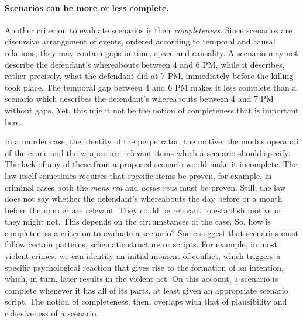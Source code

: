 \documentclass[10pt]{article}
\begin{document}






\paragraph{Scenarios can be more or less complete.}

Another criterion to evaluate scenarios is their \textit{completeness}. Since scenarios are discursive arrangement of events, ordered according to 
temporal and causal relations, they may contain gaps in time, space and causality. A scenario may not describe the defendant's whereabouts between 4 and 6 PM, 
while it describes, rather precisely, what the defendant did at 7 PM, immediately before the killing took place. The temporal gap between 4 and 6 PM 
makes it less complete than a scenario which describes the defendant's whereabouts between 4 and 7 PM without gaps. 
Yet, this might not be the notion of completeness that is important here.  

In a murder case, the identity of the perpetrator, the motive, the 
modus operandi of the crime and the weapon are relevant items which a scenario should specify. 
The lack of any of these from a proposed scenario would make it incomplete. 
The law itself sometimes requires that specific items be proven, 
for example, in criminal cases both the \textit{mens rea} and \textit{actus reus} 
must be proven.   Still, the law does not say whether the defendant's whereabouts the day before or a month before 
the murder are relevant. They could be relevant to establish motive or they might not. 
This depends on the circumstances of the case. So, how is completeness a criterion to evaluate 
a scenario? Some suggest that scenarios must follow certain patterns, 
schematic structure or scripts. For example, in most violent crimes, we can identify an initial 
moment of conflict, which triggers a specific psychological reaction that gives rise to the formation of an 
intention, which, in turn, later results in the violent act. On this account, a scenario is 
complete whenever it has all of its parts, at least given an appropriate scenario script.
The notion of completeness, then, overlaps with 
that of plausibility and cohesiveness of a scenario.
\end{document}
